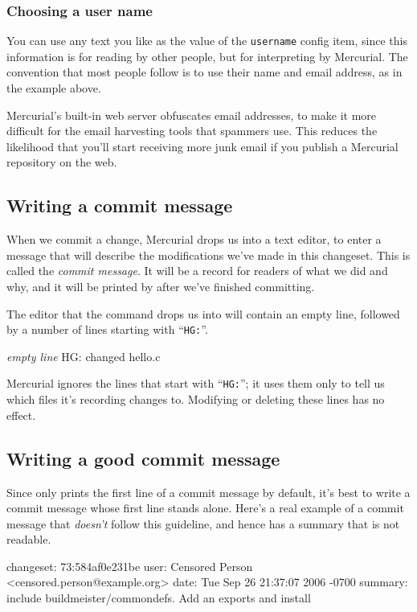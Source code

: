 \subsubsection{Choosing a user name}

You can use any text you like as the value of the \texttt{username}
config item, since this information is for reading by other people,
but for interpreting by Mercurial.  The convention that most people
follow is to use their name and email address, as in the example
above.

\begin{note}
  Mercurial's built-in web server obfuscates email addresses, to make
  it more difficult for the email harvesting tools that spammers use.
  This reduces the likelihood that you'll start receiving more junk
  email if you publish a Mercurial repository on the web.
\end{note}

\subsection{Writing a commit message}

When we commit a change, Mercurial drops us into a text editor, to
enter a message that will describe the modifications we've made in
this changeset.  This is called the \emph{commit message}.  It will be
a record for readers of what we did and why, and it will be printed by
 after we've finished committing.

The editor that the  command drops us into will contain
an empty line, followed by a number of lines starting with
``\texttt{HG:}''.
\begin{codesample2}
  \emph{empty line}
  HG: changed hello.c
\end{codesample2}
Mercurial ignores the lines that start with ``\texttt{HG:}''; it uses
them only to tell us which files it's recording changes to.  Modifying
or deleting these lines has no effect.

\subsection{Writing a good commit message}

Since  only prints the first line of a commit message by
default, it's best to write a commit message whose first line stands
alone.  Here's a real example of a commit message that \emph{doesn't}
follow this guideline, and hence has a summary that is not readable.
\begin{codesample2}
  changeset:   73:584af0e231be
  user:        Censored Person <censored.person@example.org>
  date:        Tue Sep 26 21:37:07 2006 -0700
  summary:     include buildmeister/commondefs.   Add an exports and install
\end{codesample2}

